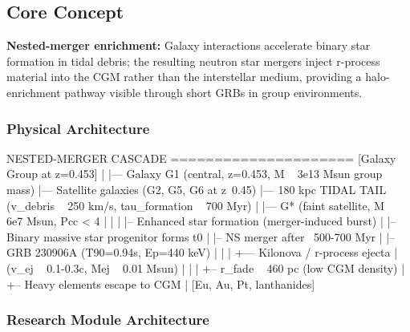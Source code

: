 \documentclass[11pt,letterpaper]{article}
\begin{document}
\subsection{Core Concept}

\textbf{Nested-merger enrichment:} Galaxy interactions accelerate binary star formation in tidal debris; the resulting neutron star mergers inject r-process material into the CGM rather than the interstellar medium, providing a halo-enrichment pathway visible through short GRBs in group environments.

\subsubsection{Physical Architecture}

\begin{asciibox}
NESTED-MERGER CASCADE
=====================
[Galaxy Group at z=0.453]
   |
   |--- Galaxy G1 (central, z=0.453, M ~ 3e13 Msun group mass)
   |--- Satellite galaxies (G2, G5, G6 at z~0.45)
   |--- 180 kpc TIDAL TAIL (v_debris ~ 250 km/s, tau_formation ~ 700 Myr)
              |
              |--- G* (faint satellite, M ~ 6e7 Msun, Pcc < 4%
              |        |
              |        |-- Enhanced star formation (merger-induced burst)
              |        |-- Binary massive star progenitor forms t0
              |        |-- NS merger after ~500-700 Myr
              |        |-- GRB 230906A (T90=0.94s, Ep=440 keV)
              |                |
              |                +--- Kilonova / r-process ejecta
              |                     (v_ej ~ 0.1-0.3c, Mej ~ 0.01 Msun)
              |                     |
              |                     +-- r_fade ~ 460 pc (low CGM density)
              |                     +-- Heavy elements escape to CGM
              |                         [Eu, Au, Pt, lanthanides]
\end{asciibox}

\subsubsection{Research Module Architecture}
\end{document}

